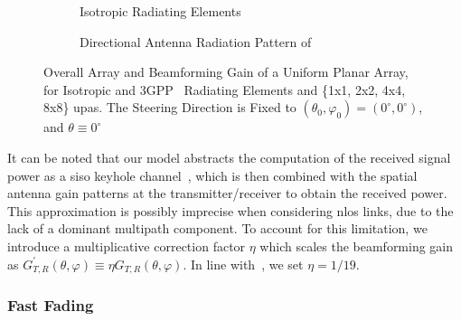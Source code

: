  \begin{figure}
  \centering
  \begin{subfigure}[t]{\columnwidth}
    \centering 
    \setlength{}
    \setlength{}
    
    \caption{Isotropic Radiating Elements}
    \vspace*{2mm}
    \label{fig:pattern_iso}
  \end{subfigure}
 \hfill
  \begin{subfigure}[t]{\columnwidth}
    \centering 
    \setlength{}
    \setlength{}
    
    \caption{Directional Antenna Radiation Pattern of~\cite[Section~7.3]{TR38901}}
    \label{fig:pattern_3gpp}
  \end{subfigure}
  \caption{Overall Array and Beamforming Gain of a Uniform Planar Array, for Isotropic and 3GPP~\cite[Section~7.3]{TR38901} Radiating Elements and \{1x1, 2x2, 4x4, 8x8\} \glspl{upa}. The Steering Direction is Fixed to $\left(\theta_0, \varphi_0\right) = (0^{\circ}, 0^{\circ})$, and $\theta \equiv 0^{\circ}$}
  \label{Fig:rad_pattern}
\end{figure}

It can be noted that our model abstracts the computation of the received signal power as a \gls{siso} keyhole channel~\cite{chizhik2000capacities}, which is then combined with the spatial antenna gain
patterns at the transmitter/receiver to obtain the received power. This approximation is possibly imprecise when considering \gls{nlos} links, due to the lack of a dominant multipath component. To account for this limitation, we introduce a multiplicative correction factor $\eta$ which scales the beamforming gain as $G^{'}_{T, R}(\theta, \varphi) \equiv \eta G_{T, R}(\theta, \varphi) $. In line with~\cite{kulkarni2018correction}, we set $\eta = 1 / 19$.

\subsubsection{Fast Fading}


